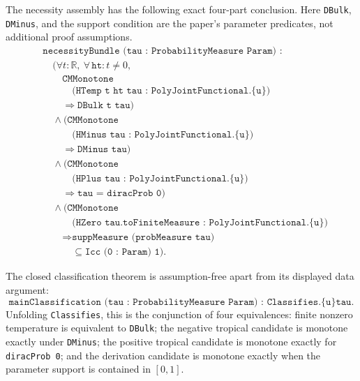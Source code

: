 The necessity assembly has the following exact four-part conclusion.  Here
\texttt{DBulk}, \texttt{DMinus}, and the support condition are the
paper's parameter predicates, not additional proof assumptions.
{\small
\[
\begin{aligned}
&\texttt{necessityBundle (tau : ProbabilityMeasure Param) :}\\
&\quad
 \bigl(\forall t:\mathbb R,\ \forall\,\texttt{ht}:t\ne0,\\
&\qquad \texttt{CMMonotone}\\
&\qquad\quad \texttt{(HTemp t ht tau : PolyJointFunctional.\{u\})}\\
&\qquad \Longrightarrow \texttt{DBulk t tau}\bigr)\\
&\quad\land
 \bigl(\texttt{CMMonotone}\\
&\qquad\quad \texttt{(HMinus tau : PolyJointFunctional.\{u\})}\\
&\qquad \Longrightarrow \texttt{DMinus tau}\bigr)\\
&\quad\land
 \bigl(\texttt{CMMonotone}\\
&\qquad\quad \texttt{(HPlus tau : PolyJointFunctional.\{u\})}\\
&\qquad \Longrightarrow \texttt{tau = diracProb 0}\bigr)\\
&\quad\land
 \bigl(\texttt{CMMonotone}\\
&\qquad\quad \texttt{(HZero tau.toFiniteMeasure : PolyJointFunctional.\{u\})}\\
&\qquad \Longrightarrow \texttt{suppMeasure (probMeasure tau)}\\
&\qquad\quad \subseteq \texttt{Icc (0 : Param) 1}\bigr).
\end{aligned}
\]
}

The closed classification theorem is assumption-free apart from its displayed
data argument:
\[
  \texttt{mainClassification (tau : ProbabilityMeasure Param) : }
  \texttt{Classifies.\{u\} tau}.
\]
Unfolding \texttt{Classifies}, this is the conjunction of four equivalences:
finite nonzero temperature is equivalent to \texttt{DBulk}; the negative
tropical candidate is monotone exactly under \texttt{DMinus}; the positive
tropical candidate is monotone exactly for \texttt{diracProb 0}; and the
derivation candidate is monotone exactly when the parameter support is
contained in \([0,1]\).

